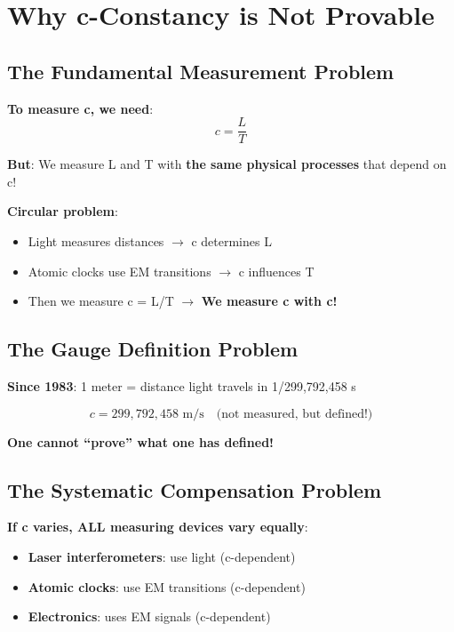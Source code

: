 	\section{Why c-Constancy is Not Provable}
	
	\subsection{The Fundamental Measurement Problem}
	
	\textbf{To measure c, we need}:
	\begin{equation}
		c = \frac{L}{T}
	\end{equation}
	
	\textbf{But}: We measure L and T with \textbf{the same physical processes} that depend on c!
	
	\textbf{Circular problem}:
	\begin{itemize}
		\item Light measures distances $\rightarrow$ c determines L
		\item Atomic clocks use EM transitions $\rightarrow$ c influences T
		\item Then we measure c = L/T $\rightarrow$ \textbf{We measure c with c!}
	\end{itemize}
	
	\subsection{The Gauge Definition Problem}
	
	\textbf{Since 1983}: 1 meter = distance light travels in 1/299,792,458 s
	
	\begin{equation}
		c = 299,792,458 \text{ m/s} \quad \text{(not measured, but defined!)}
	\end{equation}
	
	\textbf{One cannot ``prove'' what one has defined!}
	
	\subsection{The Systematic Compensation Problem}
	
	\textbf{If c varies, ALL measuring devices vary equally}:
	\begin{itemize}
		\item \textbf{Laser interferometers}: use light (c-dependent)
		\item \textbf{Atomic clocks}: use EM transitions (c-dependent)
		\item \textbf{Electronics}: uses EM signals (c-dependent)
	\end{itemize}
	
